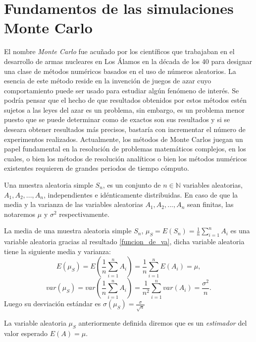 \documentclass[../proyecto.tex]{memoir}
\begin{document}

\section{Fundamentos de las simulaciones Monte Carlo} \label{MonteCarlo}

El nombre \textit{Monte Carlo} fue acuñado por los científicos que trabajaban en el desarrollo de armas nucleares en Los Álamos en la década de los 40 para designar una clase de métodos numéricos basados en el uso de números aleatorios. La esencia de este método reside en la invención de juegos de azar cuyo comportamiento puede ser usado para estudiar algún fenómeno de interés. Se podría pensar que el hecho de que resultados obtenidos por estos métodos estén sujetos a las leyes del azar es un problema, sin embargo, es un problema menor puesto que se puede determinar como de exactos son sus resultados y si se deseara obtener resultados más precisos, bastaría con incrementar el número de experimentos realizados. Actualmente, los métodos de Monte Carlos juegan un papel fundamental en la resolución de problemas matemáticos complejos, en los cuales, o bien los métodos de resolución analíticos o bien los métodos numéricos existentes requieren de grandes periodos de tiempo cómputo.

\begin{defi}
Una muestra aleatoria simple $S_n$, es un conjunto de $n\in\mathds{N}$ variables aleatorias, $A_1,A_2,...,A_n$, independientes e idénticamente distribuidas. En caso de que la media y la varianza de las variables aleatorias $A_1,A_2,...,A_n$ sean finitas, las notaremos $\mu$ y $\sigma^2$ respectivamente.
\end{defi}

La media de una muestra aleatoria simple $S_n$, $\mu_S = E(S_n) = \frac{1}{n}\sum_{i=1}^n A_i$ es una variable aleatoria gracias al resultado \ref{funcion_de_va}, dicha variable aleatoria tiene la siguiente media y varianza:$$
E(\mu_S) = E(\frac{1}{n}\sum_{i=1}^n A_i) = \frac{1}{n}\sum_{i=1}^n E(A_i) = \mu,
$$
$$
var(\mu_S) = var(\frac{1}{n}\sum_{i=1}^n A_i) = \frac{1}{n^2} \sum_{i=1}^n var(A_i) = \frac{\sigma^2}{n}.
$$
Luego su desviación estándar es $\sigma(\mu_S) = \frac{\sigma}{\sqrt{n}}$ 
\begin{defi}
La variable aleatoria $\mu_S$ anteriormente definida diremos que es un \textit{estimador} del valor esperado $E(A)=\mu$.
\end{defi}
\end{document}
